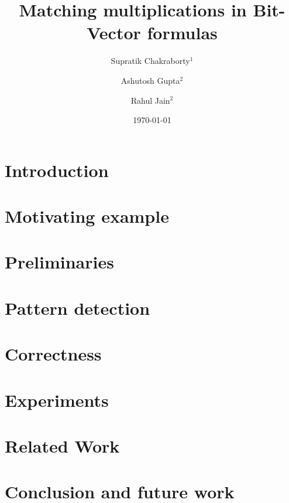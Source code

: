 \documentclass{llncs}
\begin{document}
\title{Matching multiplications in Bit-Vector formulas}

\author{Supratik Chakraborty$^1$ \and Ashutosh Gupta$^2$ \and Rahul Jain$^2$}


\date{\today}

\maketitle
\begin{abstract}

\end{abstract}

\section{Introduction}
\label{sec:intro}


\section{Motivating example}
\label{sec:motivating}


\section{Preliminaries}
\label{sec:prelim}


\section{Pattern detection}
\label{sec:pattern}


\section{Correctness}
\label{sec:correct}


\section{Experiments}
\label{sec:experiments}



\section{Related Work}
\label{sec:related}

\section{Conclusion and future work}
\label{sec:conclusion}




\end{document}
